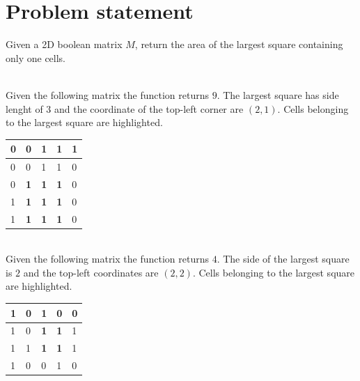 \section{Problem statement}
\begin{exercise}
Given a 2D boolean matrix $M$, return the area of the largest square containing only one cells.
	\begin{example}
		\hfill \\
		Given the following matrix the function returns $9$. The largest square has side lenght of
		$3$ and the coordinate of the top-left corner are $(2,1)$. Cells belonging to the largest
		square are highlighted.

		\begin{tabular}{|l|l|l|l|l|}
		\hline
		0 & 0                                  & 1                                  & 1 & 1 \\
		\hline
		0 & 0                                  & 1                                  & 1 & 0 \\
		\hline
		0 & \cellcolor[HTML]{32CB00}\textbf{1} & \cellcolor[HTML]{32CB00}\textbf{1} &
		\cellcolor[HTML]{32CB00}\textbf{1} & 0 \\ \hline
		1 & \cellcolor[HTML]{32CB00}\textbf{1} & \cellcolor[HTML]{32CB00}\textbf{1} &
		\cellcolor[HTML]{32CB00}\textbf{1} & 0 \\ \hline
		1 & \cellcolor[HTML]{32CB00}\textbf{1} & \cellcolor[HTML]{32CB00}\textbf{1} &
		\cellcolor[HTML]{32CB00}\textbf{1} & 0 \\ \hline
		\end{tabular}
		
	\end{example}

	\begin{example}
		\hfill \\
		Given the following matrix the function returns $4$. The side of the largest square is $2$
		and the top-left coordinates are $(2,2)$. Cells belonging to the largest square are
		highlighted.
		
		\begin{tabular}{|l|l|l|l|l|}
		\hline
		1 & 0 & 1                                  & 0                                  & 0 \\
		\hline
		1 & 0 & \cellcolor[HTML]{32CB00}\textbf{1} & \cellcolor[HTML]{32CB00}\textbf{1} & 1 \\
		\hline
		1 & 1 & \cellcolor[HTML]{32CB00}\textbf{1} & \cellcolor[HTML]{32CB00}\textbf{1} & 1 \\
		\hline
		1 & 0 & 0                                  & 1                                  & 0 \\
		\hline
\end{tabular}

	\end{example}

\end{exercise}


